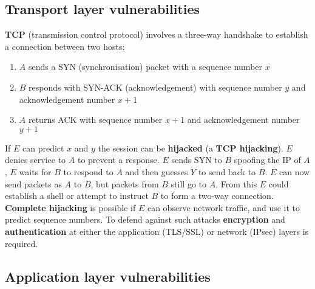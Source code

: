 \documentclass{article}
\begin{document}
\subsection{Transport layer vulnerabilities}
\textbf{TCP} (transmission control protocol) involves a three-way handshake to establish a connection between two hosts:
\begin{enumerate}
	\item $ A $ sends a SYN (synchronisation) packet with a sequence number $ x $
	\item $ B $ responds with SYN-ACK (acknowledgement) with sequence number $ y $ and acknowledgement number $ x + 1 $
	\item $ A $ returns ACK with sequence number $ x + 1 $ and acknowledgement number $ y + 1 $
\end{enumerate}
If $ E $ can predict $ x $ and $ y $ the session can be \textbf{hijacked} (a \textbf{TCP hijacking}). $ E $ denies service to $ A $ to prevent a  response. $ E $ sends SYN to $ B $ spoofing the IP of $ A $, $ E $ waits for $ B $ to respond to $ A $ and then guesses $ Y $ to send back to $ B $. $ E $ can now send packets as $ A $ to $ B $, but packets from $ B $ still go to $ A $. From this $ E $ could establish a shell or attempt to instruct $ B $ to form a two-way connection. \textbf{Complete hijacking} is possible if $ E $ can observe network traffic, and use it to predict sequence numbers. To defend against such attacks \textbf{encryption} and \textbf{authentication} at either the application (TLS/SSL) or network (IPsec) layers is required.

\subsection{Application layer vulnerabilities}
\end{document}
